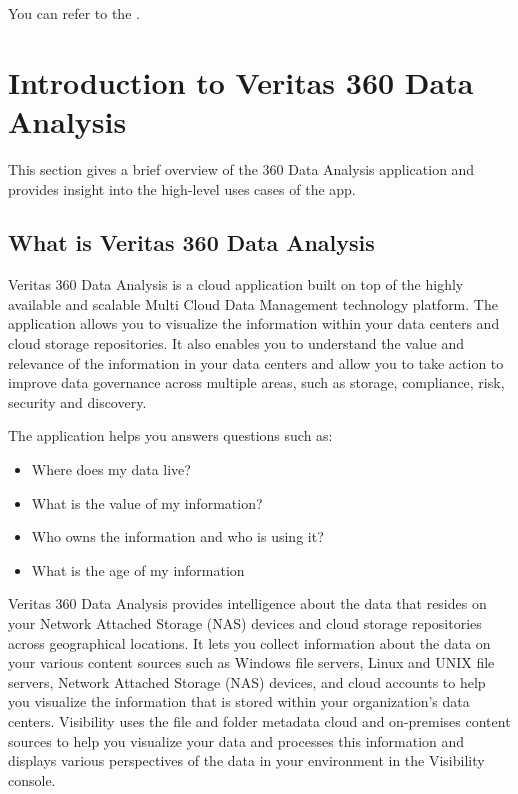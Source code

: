 \documentclass[letterpaper,10pt,english]{sphinxmanual}
\begin{document}
You can refer to the .


\section{Introduction to Veritas 360 Data Analysis}
\label{\detokenize{mcdmp_app_ug:introduction-to-veritas-360-data-analysis}}
This section gives a brief overview of the 360 Data Analysis application and provides insight into the high-level uses cases of the app.


\subsection{What is Veritas 360 Data Analysis}
\label{\detokenize{mcdmp_app_ug:what-is-veritas-360-data-analysis}}
Veritas 360 Data Analysis is a cloud application built on top of the highly available and scalable Multi Cloud Data Management technology platform. The application allows you to visualize the information within your data centers and cloud storage repositories. It also enables you to understand the value and relevance of the information in your data centers and allow you to take action to improve data governance across multiple areas, such as storage, compliance, risk, security and discovery.

The application helps you answers questions such as:
\begin{itemize}
\item {} 
Where does my data live?

\item {} 
What is the value of my information?

\item {} 
Who owns the information and who is using it?

\item {} 
What is the age of my information

\end{itemize}

Veritas 360 Data Analysis provides intelligence about the data that resides on your Network Attached Storage (NAS) devices and cloud storage repositories across geographical locations. It lets you collect information about the data on your various content sources such as Windows file servers, Linux and UNIX file servers, Network Attached Storage (NAS) devices, and cloud accounts to help you visualize the information that is stored within your organization’s data centers. Visibility uses the file and folder metadata cloud and on-premises content sources to help you visualize your data and processes this information and displays various perspectives of the data in your environment in the Visibility console.
\end{document}
